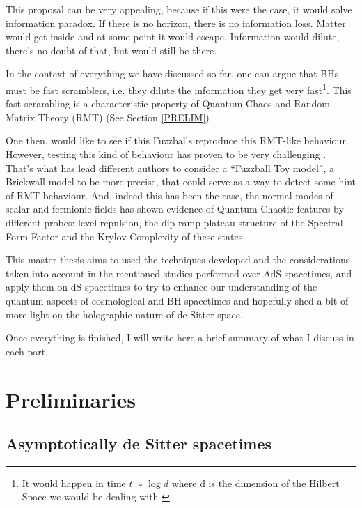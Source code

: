 \documentclass[11pt,a4paper]{article}
\begin{document}
This proposal can be very appealing, because if this were the case, it would solve information paradox. If there is no horizon, there is no information loss. Matter would get inside and at some point it would escape. Information would dilute, there's no doubt of that, but would still be there.

In the context of everything we have discussed so far, one can argue that BHs must be fast scramblers, i.e. they dilute the information they get very fast\footnote{It would happen in time $t\sim \log d$ where d is the dimension of the Hilbert Space we would be dealing with \cite{Sekino_2008}}. This fast scrambling is a characteristic property of Quantum Chaos and Random Matrix Theory (RMT) (See Section \ref{PRELIM})

One then, would like to see if this Fuzzballs reproduce this RMT-like behaviour. However, testing this kind of behaviour has proven to be very challenging \cite{Das_2023}. That's what has lead different authors \cite{Das_2023,Jeong_2025,das2023fuzzballsrandommatrices,das2023brickwallrotatingbtzdiprampplateau,das2025brickwalladsschwarzschildblack} to consider a \textquotedblleft Fuzzball Toy model\textquotedblright, a Brickwall model to be more precise, that could serve as a way to detect some hint of RMT behaviour. And, indeed this has been the case, the normal modes of scalar and fermionic fields has shown evidence of Quantum Chaotic features by different probes: level-repulsion, the dip-ramp-plateau structure of the Spectral Form Factor and the Krylov Complexity of these states.

This master thesis aims to used the techniques developed and the considerations taken into account in the mentioned studies performed over AdS spacetimes, and apply them on dS spacetimes to try to enhance our understanding of the quantum aspects of cosmological and BH spacetimes and hopefully shed a bit of more light on the holographic nature of de Sitter space. 

{\noindent\color{red} Once everything is finished, I will write here a brief summary of what I discuss in each part.}

%    

\section{Preliminaries}
\subsection{Asymptotically de Sitter spacetimes}
\end{document}
